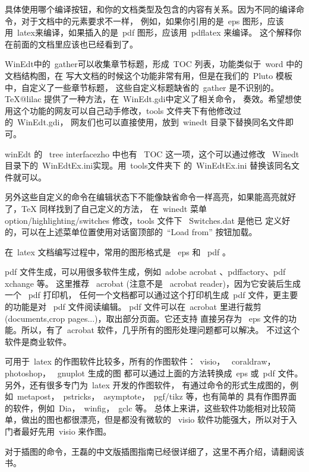 具体使用哪个编译按钮，和你的文档类型及包含的内容有关系。因为不同的编译命令，对于文档中的元素要求不一样，
例如，如果你引用的是~eps 图形，应该用~latex来编译，如果插入的是~pdf 图形，应该用~pdflatex 来编译。
这个解释你在前面的文档里应该也已经看到了。


WinEdt中的~gather可以收集章节标题，形成~TOC 列表，功能类似于~word 中的文档结构图，在
写大文档的时候这个功能非常有用，但是在我们的~Pluto 模板中，自定义了一些章节标题，
这些自定义标题缺省的~gather 是不识别的。TeX@lilac 提供了一种方法，在~WinEdt.gdi中定义了相关命令，
奏效。希望想使用这个功能的网友可以自己动手修改，tools 文件夹下有他修改过的~WinEdt.gdi，
网友们也可以直接使用，放到~winedt 目录下替换同名文件即可。

winEdt 的~ tree interfacezho 中也有~ TOC 这一项，这个可以通过修改 ~Winedt目录下的~WinEdtEx.ini实现。用~tools文件夹下
的~WinEdtEx.ini 替换该同名文件就可以。

另外这些自定义的命令在编辑状态下不能像缺省命令一样高亮，如果能高亮就好了，TeX 同样找到了自己定义的方法，
在~winedt 菜单~ option/highlighting/switches 修改，tools 文件下~ Switches.dat 是他已
定义好的，可以在上述菜单位置使用对话窗顶部的~``Load from'' 按钮加载。


在~latex 文档编写过程中，常用的图形格式是~ eps 和~ pdf 。

pdf 文件生成，可以用很多软件生成，例如~adobe acrobat 、pdffactory、pdf xchange 等。
这里推荐~ acrobat (注意不是~ acrobat  reader)，因为它安装后生成一个~ pdf 打印机，
任何一个文档都可以通过这个打印机生成~pdf 文件，更主要的功能是对~ pdf 文件阅读编辑。
pdf 文件可以在~acrobat 里进行裁剪~ (documents,crop pages...)，取出部分页面。它还支持
直接另存为~ eps 文件的功能。所以，有了~acrobat 软件，几乎所有的图形处理问题都可以解决。
不过这个软件是商业软件。

可用于~latex 的作图软件比较多，所有的作图软件：~visio，~ coraldraw，~ photoshop，~ gnuplot 生成的图
都可以通过上面的方法转换成~eps 或~pdf 文件。另外，还有很多专门为~latex 开发的作图软件，
有通过命令的形式生成图的，例如~metapost，~pstricks，~asymptote，~pgf/tikz 等，也有简单的
具有作图界面的软件，例如~Dia，~winfig，~gclc 等。  总体上来讲，这些软件功能相对比较简单，做出的图也都很漂亮，但是都没有微软的
~visio 软件功能强大，所以对于入门者最好先用~visio 来作图。

对于插图的命令，王磊的中文版插图指南已经很详细了，这里不再介绍，请翻阅该书。

